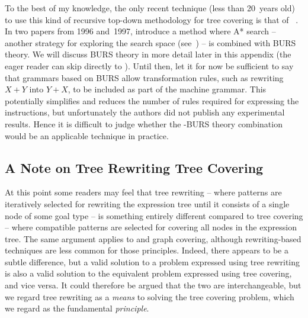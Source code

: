
To the best of my knowledge, the only recent technique (less than \num{20}~years
old) to use this kind of recursive top-down methodology for \gls{tree covering}
is that of \citeauthor{NymeyerEtAl:1996}~\cite{NymeyerEtAl:1996,
  NymeyerKatoen:1997}.
%
In two papers from 1996 and~1997, \citeauthor{NymeyerEtAl:1996} introduce a
method where \gls{A* search} -- another strategy for exploring the search space
(see~\cite{RussellNorvig:2010}) -- is combined with \gls{BURS} theory.
%
We will discuss \gls{BURS} theory in more detail later in this appendix (the
eager reader can skip directly to ).
%
Until then, let it for now be sufficient to say that \glspl{grammar} based on
\gls{BURS} allow transformation \glspl{rule}, such as rewriting \mbox{$X + Y$}
into \mbox{$Y + X$}, to be included as part of the \gls{machine grammar}.
%
This potentially simplifies and reduces the number of \glspl{rule} required for
expressing the \glspl{instruction}, but unfortunately the authors did not
publish any experimental results.
%
Hence it is difficult to judge whether the \mbox{-\gls{BURS}} theory combination would be an applicable technique in
practice.



\subsection{A Note on Tree Rewriting \versus Tree Covering}

At this point some readers may feel that \gls{tree rewriting} -- where
\glspl{pattern} are iteratively selected for rewriting the \gls{expression tree}
until it consists of a single \gls{node} of some goal type -- is something
entirely different compared to \gls{tree covering} -- where compatible
\glspl{pattern} are selected for covering all \glspl{node} in the
\gls{expression tree}.
%
The same argument applies to  and \gls{graph covering},
although rewriting-based techniques are less common for those \glspl{principle}.
%
Indeed, there appears to be a subtle difference, but a valid solution to a
problem expressed using \gls{tree rewriting} is also a valid solution to the
equivalent problem expressed using \gls{tree covering}, and vice versa.
%
It could therefore be argued that the two are interchangeable, but we regard
\gls{tree rewriting} as a \emph{means} to solving the \gls{tree covering}
problem, which we regard as the fundamental \emph{\gls{principle}}.


